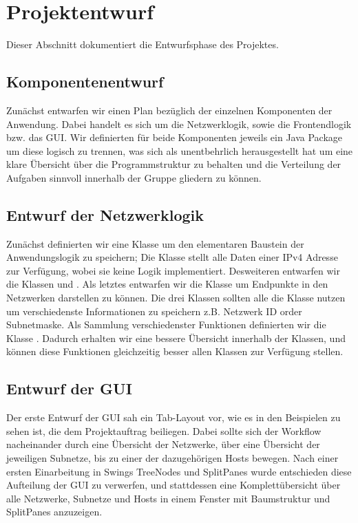 \section{Projektentwurf}
Dieser Abschnitt dokumentiert die Entwurfsphase des Projektes.

\subsection{Komponentenentwurf}
Zunächst entwarfen wir einen Plan bezüglich der einzelnen Komponenten der Anwendung.
Dabei handelt es sich um die Netzwerklogik, sowie die Frontendlogik bzw. das GUI.
Wir definierten für beide Komponenten jeweils ein Java Package um diese logisch zu trennen, was
sich als unentbehrlich herausgestellt hat um eine klare Übersicht über die Programmstruktur zu behalten
und die Verteilung der Aufgaben sinnvoll innerhalb der Gruppe gliedern zu können.

\subsection{Entwurf der Netzwerklogik}
Zunächst definierten wir eine Klasse um den elementaren Baustein der Anwendungslogik zu speichern;
Die Klasse  stellt alle Daten einer IPv4 Adresse zur Verfügung,
wobei sie keine Logik implementiert. Desweiteren entwarfen wir die Klassen  und .
Als letztes entwarfen wir die Klasse  um Endpunkte in den Netzwerken darstellen zu können.
Die drei Klassen sollten alle die Klasse  nutzen um verschiedenste Informationen
zu speichern z.B. Netzwerk ID order Subnetmaske.
Als Sammlung verschiedenster Funktionen definierten wir die Klasse .
Dadurch erhalten wir eine bessere Übersicht innerhalb der Klassen, und können diese Funktionen gleichzeitig
besser allen Klassen zur Verfügung stellen.

\subsection{Entwurf der GUI}
Der erste Entwurf der GUI sah ein Tab-Layout vor, wie es in den Beispielen zu sehen ist,
die dem Projektauftrag beiliegen. Dabei sollte sich der Workflow nacheinander durch eine
Übersicht der Netzwerke, über eine Übersicht der jeweiligen Subnetze, bis zu einer der
dazugehörigen Hosts bewegen. Nach einer ersten Einarbeitung in Swings TreeNodes und SplitPanes
wurde entschieden diese Aufteilung der GUI zu verwerfen, und stattdessen eine Komplettübersicht über 
alle Netzwerke, Subnetze und Hosts in einem Fenster mit Baumstruktur und SplitPanes anzuzeigen.